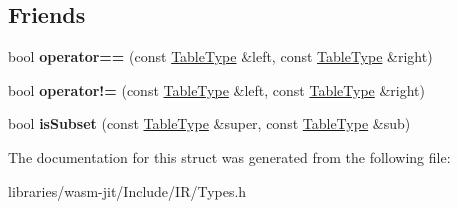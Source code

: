 \subsection*{Friends}
\begin{DoxyCompactItemize}
\item 
\mbox{\label{struct_i_r_1_1_table_type_ac088b078615d3c7cb48b0df2c7ee395d}} 
bool {\bfseries operator==} (const \mbox{\hyperlink{struct_i_r_1_1_table_type}{Table\+Type}} \&left, const \mbox{\hyperlink{struct_i_r_1_1_table_type}{Table\+Type}} \&right)
\item 
\mbox{\label{struct_i_r_1_1_table_type_ac9b12a8a11e9b2c29d4957a75e29f2e2}} 
bool {\bfseries operator!=} (const \mbox{\hyperlink{struct_i_r_1_1_table_type}{Table\+Type}} \&left, const \mbox{\hyperlink{struct_i_r_1_1_table_type}{Table\+Type}} \&right)
\item 
\mbox{\label{struct_i_r_1_1_table_type_a81d00b4d18a9b7342bb56c1e37625b41}} 
bool {\bfseries is\+Subset} (const \mbox{\hyperlink{struct_i_r_1_1_table_type}{Table\+Type}} \&super, const \mbox{\hyperlink{struct_i_r_1_1_table_type}{Table\+Type}} \&sub)
\end{DoxyCompactItemize}


The documentation for this struct was generated from the following file\+:\begin{DoxyCompactItemize}
\item 
libraries/wasm-\/jit/\+Include/\+I\+R/Types.\+h\end{DoxyCompactItemize}
